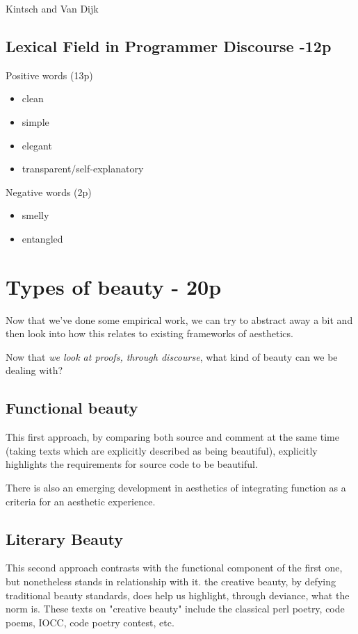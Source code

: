 Kintsch and Van Dijk

\subsection{Lexical Field in Programmer Discourse -12p}

Positive words (13p)

\begin{itemize}
    \item clean
    \item simple
    \item elegant
    \item transparent/self-explanatory
\end{itemize}

Negative words (2p)

\begin{itemize}
    \item smelly
    \item entangled
\end{itemize}

\section{Types of beauty  - 20p}

Now that we've done some empirical work, we can try to abstract away a bit and then look into how this relates to existing frameworks of aesthetics. 

Now that \emph{we look at proofs, through discourse}, what kind of beauty can we be dealing with?

\subsection{Functional beauty}

This first approach, by comparing both source and comment at the same time (taking texts which are explicitly described as being beautiful), explicitly highlights the requirements for source code to be beautiful. 

There is also an emerging development in aesthetics of integrating function as a criteria for an aesthetic experience.

\subsection{Literary Beauty}

This second approach contrasts with the functional component of the first one, but nonetheless stands in relationship with it. the creative beauty, by defying traditional beauty standards, does help us highlight, through deviance, what the norm is. These texts on "creative beauty" include the classical perl poetry, code poems, IOCC, code poetry contest, etc.

